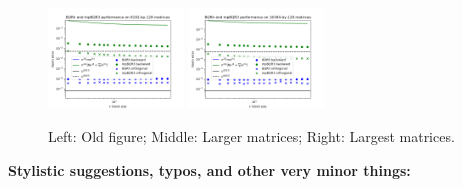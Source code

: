 \documentclass[final,onefignum,onetabnum]{siamart190516}
\begin{document}
\begin{enumerate}
\begin{figure}[h!]
        \includegraphics[width=0.32\textwidth]{./figures/13-07.png}
        \includegraphics[width=0.32\textwidth]{./figures/14-07.png}
        \caption{\label{fig:Fig2} Left: Old figure; Middle: Larger matrices; Right: Largest matrices.}
        \vspace{-10pt}
    \end{figure} 
\end{enumerate}
\pagebreak
\textbf{Stylistic suggestions, typos, and other very minor things:}
\end{document}
